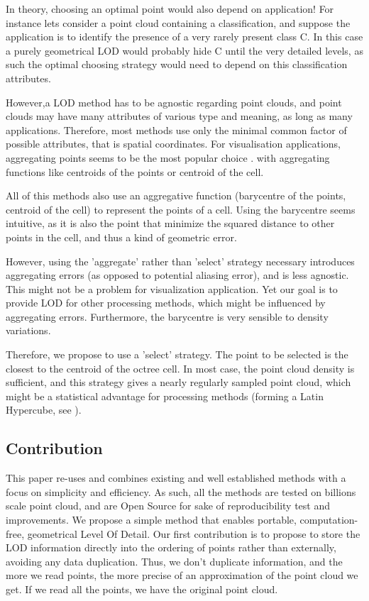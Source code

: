 	In theory, choosing an optimal point would also depend on application!
	For instance lets consider a point cloud containing a classification, and suppose the application is to identify the presence of a very rarely present class C.
	In this case a purely geometrical LOD would probably hide C until the very detailed levels, as such the optimal choosing strategy would need to depend on this classification attributes.
	
	However,a LOD method has to be agnostic regarding point clouds,
	and point clouds may have many attributes of various type and meaning, as long as many applications.
	Therefore, most methods use only the minimal common factor of possible attributes, that is spatial coordinates. 
	For visualisation applications, aggregating points seems to be the most popular choice \cite{Schutz2015,Hornung2013,Elseberg2013}. with aggregating functions like centroids of the points or centroid of the cell.
	
	All of this methods also use an aggregative function (barycentre of the points, centroid of the cell) to represent the points of a cell.
	Using the barycentre seems intuitive, as it is also the point that minimize the squared distance to other points in the cell, and thus a kind of geometric error.
	
	However, using the 'aggregate' rather than 'select' strategy necessary introduces aggregating errors
	 (as opposed to potential aliasing error), and is less agnostic.
	This might not be a problem for visualization application.
	Yet our goal is to provide LOD for other processing methods, which might be influenced by aggregating errors.
	Furthermore, the barycentre is very sensible to density variations.
	
	Therefore, we propose to use a 'select' strategy. The point to be selected is the closest to the centroid of the octree cell.
	In most case, the point cloud density is sufficient, and this strategy gives a nearly regularly sampled point cloud, which might be a statistical advantage for processing methods (forming a Latin Hypercube, see \cite{McKay1979}).
	
	

\subsection{Contribution}
	This paper re-uses and combines existing and well established methods with a focus on simplicity and efficiency. As such, all the methods are tested on billions scale point cloud, and are Open Source for sake of reproducibility test and improvements.
	We propose a simple method that enables portable, computation-free, geometrical Level Of Detail.
	Our first contribution is to propose to store the LOD information directly into the ordering of points rather than externally, avoiding any data duplication.
	Thus, we don't duplicate information, and the more we read points, the more precise of an approximation of the point cloud we get. If we read all the points, we have the original point cloud.
	
